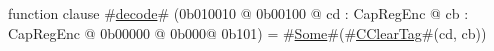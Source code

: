 function clause #\hyperref[sailMIPSzdecode]{decode}# (0b010010 @ 0b00100 @ cd : CapRegEnc @ cb : CapRegEnc @ 0b00000 @ 0b000@ 0b101)    = #\hyperref[sailMIPSzSome]{Some}#(#\hyperref[sailMIPSzCClearTag]{CClearTag}#(cd, cb))
